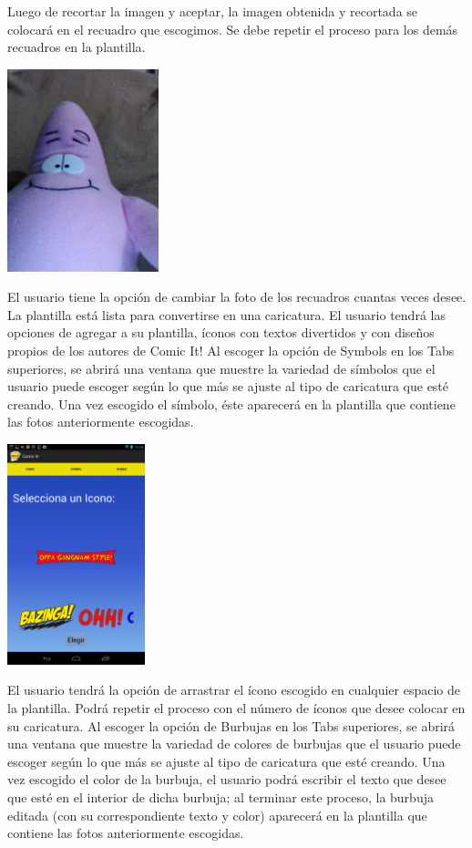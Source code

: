 \documentclass[12pt]{report}
\begin{document}
Luego de recortar la imagen y aceptar, la imagen obtenida y recortada se colocará en el recuadro que escogimos. Se debe repetir el proceso para los demás recuadros en la plantilla.
\newline
	\begin{center}
		\begingroup
			\includegraphics[width=0.33\textwidth]{imagenes_usuario/foto.jpg}
		\endgroup
	\end{center}


El usuario tiene la opción de cambiar la foto de los recuadros cuantas veces desee.
La plantilla está lista para convertirse en una caricatura.
El usuario tendrá las opciones de agregar a su plantilla, íconos con textos divertidos  y con diseños propios de los autores de Comic It!
Al escoger la opción de Symbols en los Tabs superiores, se abrirá una ventana que muestre la variedad de símbolos que el usuario puede escoger según lo que más se ajuste al tipo de caricatura que esté creando. Una vez escogido el símbolo, éste aparecerá en la plantilla que contiene las fotos anteriormente escogidas.
	\begin{center}
		\begingroup
			\includegraphics[width=0.30\textwidth]{imagenes_usuario/iconos.png}
		\endgroup
	\end{center}


El usuario tendrá la opción de arrastrar el ícono escogido en cualquier espacio de la plantilla. Podrá repetir el proceso con el número de íconos que desee colocar en su caricatura.
Al escoger la opción de Burbujas en los Tabs superiores, se abrirá una ventana que muestre la variedad de colores de burbujas que el usuario puede escoger según lo que más se ajuste al tipo de caricatura que esté creando. Una vez escogido el color de la burbuja, el usuario podrá escribir el texto que desee que esté en el interior de dicha burbuja; al terminar este proceso, la burbuja editada (con su correspondiente texto y color) aparecerá en la plantilla que contiene las fotos anteriormente escogidas.
\end{document}
